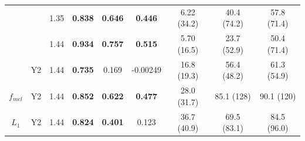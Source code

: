 \begin{subappendices}
\begin{table}[htb!]
\begin{tabular}{|ccc|ccc|ccc|}
        & & 1.35 & \textbf{0.838} & \textbf{0.646} & \textbf{0.446} & 6.22 (34.2) & 40.4 (74.2) & 57.8 (71.4) \\
        & & 1.44 & \textbf{0.934} & \textbf{0.757} & \textbf{0.515} & 5.70 (16.5) & 23.7 (52.9) & 50.4 (71.4) \\
        \cline{2-9}
        & Y2 & 1.44 & \textbf{0.735} & 0.169 & -0.00249 & 16.8 (19.3) & 56.4 (48.2) & 61.3 (54.9) \\
        \hline
        $f_{mel}$ & Y2 & 1.44 & \textbf{0.852} & \textbf{0.622} & \textbf{0.477} & 28.0 (31.7) & 85.1 (128) & 90.1 (120) \\
        \hline
        $L_1$ & Y2 & 1.44 & \textbf{0.824} & \textbf{0.401} & 0.123 & 36.7 (40.9) & 69.5 (83.1) & 84.5 (96.0) \\
        \hline
    \end{tabular}    
    \label{ap:backwardsHSIMCq}
\end{table}


\end{subappendices}
